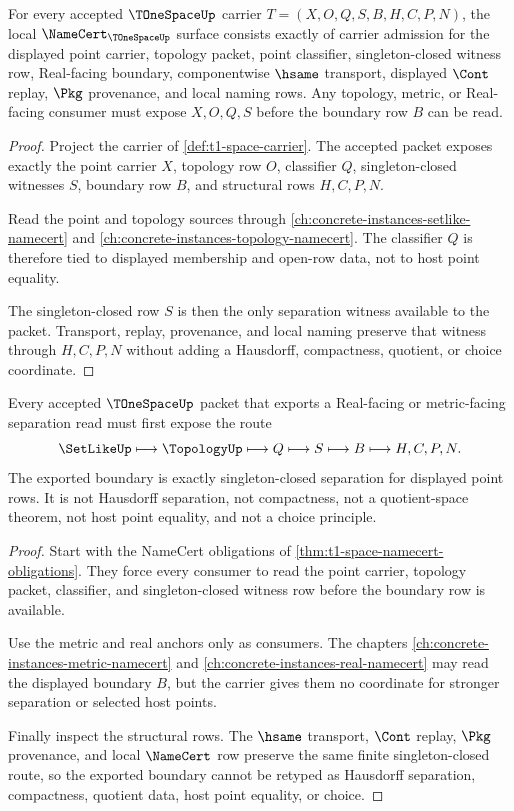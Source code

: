 \begin{theorem}\label{thm:t1-space-namecert-obligations}
For every accepted $\TOneSpaceUp$ carrier $T=(X,O,Q,S,B,H,C,P,N)$, the local $\NameCert_{\TOneSpaceUp}$ surface consists exactly of carrier admission for the displayed point carrier, topology packet, point classifier, singleton-closed witness row, Real-facing boundary, componentwise $\hsame$ transport, displayed $\Cont$ replay, $\Pkg$ provenance, and local naming rows. Any topology, metric, or Real-facing consumer must expose $X,O,Q,S$ before the boundary row $B$ can be read.
\end{theorem}
\begin{proof}
Project the carrier of \autoref{def:t1-space-carrier}. The accepted packet exposes exactly the point carrier $X$, topology row $O$, classifier $Q$, singleton-closed witnesses $S$, boundary row $B$, and structural rows $H,C,P,N$.

Read the point and topology sources through \autoref{ch:concrete-instances-setlike-namecert} and \autoref{ch:concrete-instances-topology-namecert}. The classifier $Q$ is therefore tied to displayed membership and open-row data, not to host point equality.

The singleton-closed row $S$ is then the only separation witness available to the packet. Transport, replay, provenance, and local naming preserve that witness through $H,C,P,N$ without adding a Hausdorff, compactness, quotient, or choice coordinate.
\end{proof}

\begin{theorem}\label{thm:t1-space-singleton-closed-boundary}
Every accepted $\TOneSpaceUp$ packet that exports a Real-facing or metric-facing separation read must first expose the route
$$
\SetLikeUp\longmapsto\TopologyUp\longmapsto Q\longmapsto S\longmapsto B\longmapsto H,C,P,N .
$$
The exported boundary is exactly singleton-closed separation for displayed point rows. It is not Hausdorff separation, not compactness, not a quotient-space theorem, not host point equality, and not a choice principle.
\end{theorem}
\begin{proof}
Start with the NameCert obligations of \autoref{thm:t1-space-namecert-obligations}. They force every consumer to read the point carrier, topology packet, classifier, and singleton-closed witness row before the boundary row is available.

Use the metric and real anchors only as consumers. The chapters \autoref{ch:concrete-instances-metric-namecert} and \autoref{ch:concrete-instances-real-namecert} may read the displayed boundary $B$, but the carrier gives them no coordinate for stronger separation or selected host points.

Finally inspect the structural rows. The $\hsame$ transport, $\Cont$ replay, $\Pkg$ provenance, and local $\NameCert$ row preserve the same finite singleton-closed route, so the exported boundary cannot be retyped as Hausdorff separation, compactness, quotient data, host point equality, or choice.
\end{proof}

